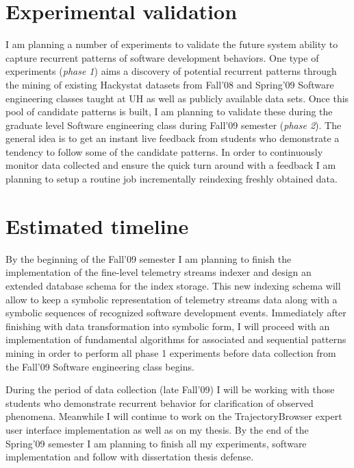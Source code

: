 \documentclass[11pt,oneside]{article}
\begin{document}
\section{Experimental validation}
I am planning a number of experiments to validate the future system ability to capture recurrent patterns of software development behaviors. One type of experiments (\textit{phase 1}) aims a discovery of potential recurrent patterns through the mining of existing Hackystat datasets from Fall'08 and Spring'09 Software engineering classes taught at UH as well as publicly available data sets. Once this pool of candidate patterns is built, I am planning to validate these during the graduate level Software engineering class during Fall'09 semester (\textit{phase 2}). The general idea is to get an instant live feedback from students who demonstrate a tendency to follow some of the candidate patterns. In order to continuously monitor data collected and ensure the quick turn around with a feedback I am planning to setup a routine job incrementally reindexing freshly obtained data.

\section{Estimated timeline}
By the beginning of the Fall'09 semester I am planning to finish the implementation of the fine-level telemetry streams indexer and design an extended database schema for the index storage. This new indexing schema will allow to keep a symbolic representation of telemetry streams data along with a symbolic sequences of recognized software development events. Immediately after finishing with data transformation into symbolic form, I will proceed with an implementation of fundamental algorithms for associated and sequential patterns mining in order to perform all phase 1 experiments before data collection from the Fall'09 Software engineering class begins.

During the period of data collection (late Fall'09) I will be working with those students who demonstrate recurrent behavior for clarification of observed phenomena. Meanwhile I will continue to work on the TrajectoryBrowser expert user interface implementation as well as on my thesis. By the end of the Spring'09 semester I am planning to finish all my experiments, software implementation and follow with dissertation thesis defense.



\end{document}
